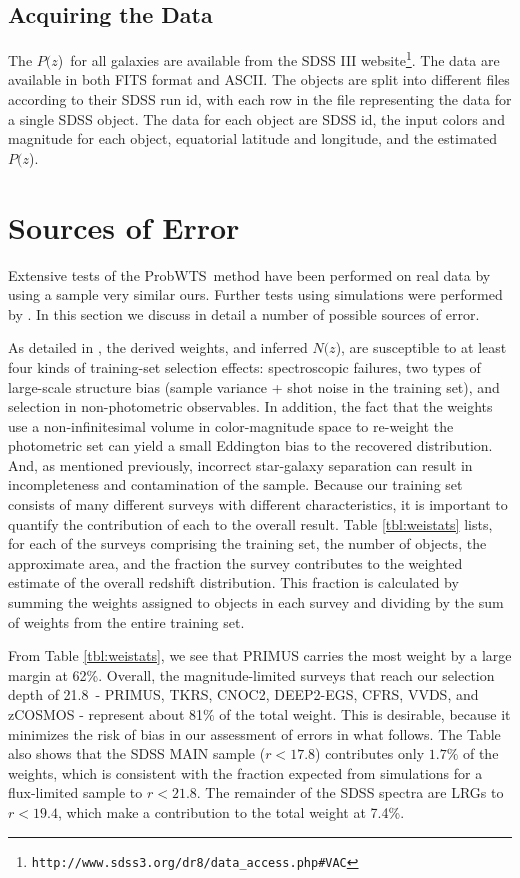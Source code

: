 \documentclass[12pt,preprint]{aastex}
\newcommand{\rmax}{21.8}
\newcommand{\pofz}{$P(z$)}
\newcommand{\nofz}{$N(z$)}
\newcommand{\downloadURL}{{\tt http://www.sdss3.org/dr8/data\_access.php\#VAC}}
\newcommand{\acronym}{ProbWTS}
\begin{document}
\subsection{Acquiring the Data} \label{sec:get}

The \pofz\ for all galaxies are available from the SDSS III
website\footnote{\downloadURL}.  The data are available in both FITS format and
ASCII.  The objects are split into different files according to their SDSS run
id, with each row in the file representing the data for a single SDSS object.
The data for each object are SDSS id, the input colors and magnitude for each
object, equatorial latitude and longitude, and the estimated \pofz.



\section{Sources of Error} \label{sec:errors}

Extensive tests of the \acronym\ method have been performed on real data by
\cite{LimaPhotoz08} using a sample very similar ours. Further tests using
simulations were performed by \cite{CunhaPhotoz09}.  In this section we discuss
in detail a number of possible sources of error.

As detailed in \cite{CunhaPhotoz09}, the derived weights, and inferred \nofz,
are susceptible to at least four kinds of training-set selection effects:
spectroscopic failures, two types of large-scale structure bias (sample
variance + shot noise in the training set), and selection in non-photometric
observables.  In addition, the fact that the weights use a non-infinitesimal
volume in color-magnitude space to re-weight the photometric set can yield a
small Eddington bias to the recovered distribution.  And, as mentioned
previously, incorrect star-galaxy separation can result in incompleteness and
contamination of the sample.  Because our training set consists of many
different surveys with different characteristics, it is important to quantify
the contribution of each to the overall result.  Table \ref{tbl:weistats}
lists, for each of the surveys comprising the training set, the number of
objects, the approximate area, and the fraction the survey contributes to the
weighted estimate of the overall redshift distribution.  This fraction is
calculated by summing the weights assigned to objects in each survey and
dividing by the sum of weights from the entire training set.


From Table \ref{tbl:weistats}, we see that PRIMUS carries the most weight by a
large margin at 62\%.  Overall, the magnitude-limited surveys that reach our
selection depth of \rmax\ - PRIMUS, TKRS, CNOC2, DEEP2-EGS, CFRS, VVDS, and
zCOSMOS - represent about 81$\%$ of the total weight.  This is desirable,
because it minimizes the risk of bias in our assessment of errors in what
follows.  The Table also shows that the SDSS MAIN sample ($r<17.8$) contributes
only $1.7\%$ of the weights, which is consistent with the fraction expected
from simulations for a flux-limited sample to $r<21.8$.  The remainder of the
SDSS spectra are LRGs to $r<19.4$, which make a contribution to the total
weight at 7.4\%.
\end{document}
